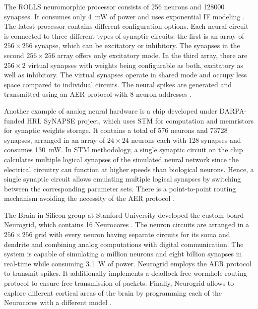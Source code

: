 The \ac{ROLLS} neuromorphic processor consists of \num{256} neurons and \num{128000} synapses.
It consumes only \SI{4}{\milli\watt} of power and uses exponential \ac{IF} modeling \parencite{Qiao2015}.
The latest processor contains different configuration options.
Each neural circuit is connected to three different types of synaptic circuits: the first is an array of $256\times256$ synapse, which can be excitatory or inhibitory.
The synapses in the second $256\times256$ array offers only excitatory mode.
In the third array, there are $256\times2$ virtual synapses with weights being configurable as both, excitatory as well as inhibitory.
The virtual synapses operate in shared mode and occupy less space compared to individual circuits.
The neural spikes are generated and transmitted using an \ac{AER} protocol with \SI{8}{\bit} neuron addresses \parencite{Qiao2015}.

Another example of analog neural hardware is a chip \parencite{Srinivasa2012} developed under \ac{DARPA}-funded \ac{HRL} \ac{SyNAPSE} project, which uses \ac{STM} for computation and memristors for synaptic weights storage.
It contains a total of \num{576} neurons and \num{73728} synapses, arranged in an array of $24\times24$ neurons each with \num{128} synapses and consumes \SI{130}{\milli\watt}.
In \ac{STM} methodology, a single synaptic circuit on the chip calculates multiple logical synapses of the simulated neural network since the electrical circuitry can function at higher speeds than biological neurons.
Hence, a single synaptic circuit allows emulating multiple logical synapses by switching between the corresponding parameter sets.
There is a point-to-point routing mechanism avoiding the necessity of the \ac{AER} protocol \parencite{Walter2015}. 

The Brain in Silicon group at Stanford University developed the custom board Neurogrid, which contains \num{16} Neurocores \parencite{Benjamin2014, Choudhary2012}.
The neuron circuits are arranged in a $256\times256$ grid with every neuron having separate circuits for its soma and  dendrite and combining analog computations with digital communication.
The system is capable of simulating a million neurons and eight billion synapses in real-time while consuming \SI{3.1}{\watt} of power.
Neurogrid employs the \ac{AER} protocol to transmit spikes.
It additionally implements a deadlock-free wormhole routing protocol to ensure free transmission of packets.
Finally, Neurogrid allows to explore different cortical areas of the brain by programming each of the Neurocores with a different model \parencite{Merolla2014}.

